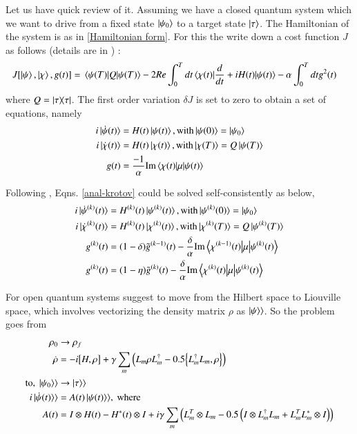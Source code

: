 Let us have quick review of it. Assuming we have a closed quantum system which we want to drive from a fixed state $ \ket{\psi _{0}}$ to a target state $ \ket{\tau} $. The Hamiltonian of the system is as in \eqref{Hamiltonian form}.
For this the write down a cost function $J$ as follows (details are in  \cite{2018EPJST.227..203S}) :
\begin{align}\label{cost_function}
    J[\ket{\psi}, \ket{\chi}, g(t)] &= \expval{Q}{\psi(T)} - 2Re\int_{0}^{T}dt \matrixelement{\chi(t)}{\dv{}{t} +  iH(t)}{\psi(t)}  - \alpha \int_{0}^{T}dt g^{2}(t)
\end{align}
where $ Q = \dyad{\tau}$. The first order variation $δJ$ is set to zero to obtain a set of equations, namely
\begin{align}\label{anal-krotov}
    i\ket{\dot{\psi}(t)} &=  H(t)\ket{\psi(t)},\text{with} \ket{\psi(0)} = \ket{\psi_{0}}\\
    i\ket{\dot{\chi}(t)} &= H(t)\ket{\chi(t)},\text{with} \ket{\chi(T)} = Q\ket{\psi(T)}\\
    g(t) &= \frac{-1}{\alpha}\text{Im}\matrixelement{\chi(t)}{\mu}{\psi(t)}
\end{align}


Following \cite{2012JChPh.136j4103R},   Eqns. \eqref{anal-krotov} could be solved self-consistently  as below,
\begin{align}\label{ansatz_krotov}
    i\ket{\dot{\psi}^{(k)}(t)} &=  H^{(k)}(t) \ket{\psi^{(k)}(t)},\text{with} \ket{\psi^{(k)}(0)} = \ket{\psi_{0}}\\
    i\ket{\dot{\chi}^{(k)}(t)} &= H^{(k)}(t) \ket{\chi^{(k)}(t)},\text{with} \ket{\chi^{(k)}(T)} = Q\ket{\psi^{(k)}(T)}\\
    g^{(k)}(t) &= (1 - \delta)\tilde{g}^{(k-1)}(t) -  \dfrac{\delta}{\alpha}\text{Im}\matrixelement{\chi^{(k-1)}(t)}{\mu}{\psi^{(k)}(t)}\\
    g^{(k)}(t) &= (1 - \eta)\tilde{g}^{(k)}(t) -  \dfrac{\delta}{\alpha}\text{Im}\matrixelement{\chi^{(k)}(t)}{\mu}{\psi^{(k)}(t)}
\end{align}

For open quantum systems \cite{2018EPJST.227..203S} suggest to move from the Hilbert space to Liouville space, which involves vectorizing the density matrix $\rho$ as $\ket{\psi}\rangle$. So the problem goes from 
 \begin{align}\label{Hilbert_liou:1}
     \rho_{0} &\rightarrow \rho_{f}\\
     \dot{\rho} &= - i\comm{H}{\rho} + \gamma\sum_{m} \left(L_{m} \rho L_{m}^{\dagger} - 0.5 \anticommutator{L_{m}^{\dagger}L_{m}}{ \rho}\right)\\
\text{to, }   
    \ket{\psi_{0}}\rangle &\rightarrow \ket{\tau}\rangle\\
    i\ket{\dot{\psi}(t)}\rangle &= A(t)\ket{\psi(t)}\rangle,  \text{ where}\\
    A(t) &= I\otimes H(t) - H^{*}(t)\otimes I + i\gamma\sum_{m} \left(
    L_{m}^{T}\otimes L_{m} - 0.5\left( I \otimes L_{m}^{\dagger} L_{m} + L_{m}^{T} L_{m}^{*} \otimes I\right)\right)
\end{align}
